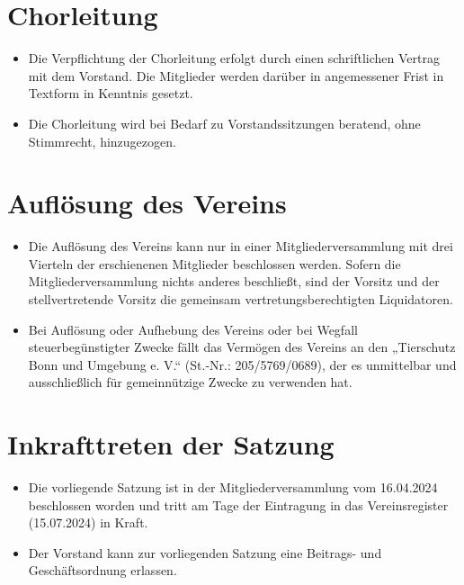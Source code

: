 \documentclass[12pt,paper=a4,ngerman]{report}
\begin{document}
\section{Chorleitung}

\begin{itemize}
    \item Die Verpflichtung der Chorleitung erfolgt durch einen schriftlichen Vertrag mit dem Vorstand. Die Mitglieder werden darüber in angemessener Frist in Textform in Kenntnis gesetzt.
    \item Die Chorleitung wird bei Bedarf zu Vorstandssitzungen beratend, ohne Stimmrecht, hinzugezogen.
\end{itemize}

\section{Auflösung des Vereins}

\begin{itemize}
    \item Die Auflösung des Vereins kann nur in einer Mitgliederversammlung mit drei Vierteln der erschienenen Mitglieder beschlossen werden. Sofern die Mitgliederversammlung nichts anderes beschließt, sind der Vorsitz und der stellvertretende Vorsitz die gemeinsam vertretungsberechtigten Liquidatoren.
    \item Bei Auflösung oder Aufhebung des Vereins oder bei Wegfall steuerbegünstigter Zwecke fällt das Vermögen des Vereins an den „Tierschutz Bonn und Umgebung e. V.“ (St.-Nr.: 205/5769/0689), der es unmittelbar und ausschließlich für gemeinnützige Zwecke zu verwenden hat.
\end{itemize}

\section{Inkrafttreten der Satzung}

\begin{itemize}
    \item Die vorliegende Satzung ist in der Mitgliederversammlung vom 16.04.2024 beschlossen worden und tritt am Tage der Eintragung in das Vereinsregister (15.07.2024) in Kraft.
    \item Der Vorstand kann zur vorliegenden Satzung eine Beitrags- und Geschäftsordnung erlassen.
\end{itemize}
\end{document}
